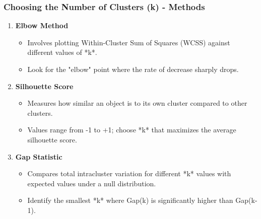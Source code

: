 \documentclass[aspectratio=169]{beamer}
\begin{document}
\begin{frame}[fragile]
  \frametitle{Choosing the Number of Clusters (k) - Methods}
  \begin{enumerate}
    \item \textbf{Elbow Method}
    \begin{itemize}
      \item Involves plotting Within-Cluster Sum of Squares (WCSS) against different values of *k*.
      \item Look for the "elbow" point where the rate of decrease sharply drops.
    \end{itemize}

    \item \textbf{Silhouette Score}
    \begin{itemize}
      \item Measures how similar an object is to its own cluster compared to other clusters.
      \item Values range from -1 to +1; choose *k* that maximizes the average silhouette score.
    \end{itemize}

    \item \textbf{Gap Statistic}
    \begin{itemize}
      \item Compares total intracluster variation for different *k* values with expected values under a null distribution.
      \item Identify the smallest *k* where Gap(k) is significantly higher than Gap(k-1).
    \end{itemize}
  \end{enumerate}
\end{frame}
\end{document}
